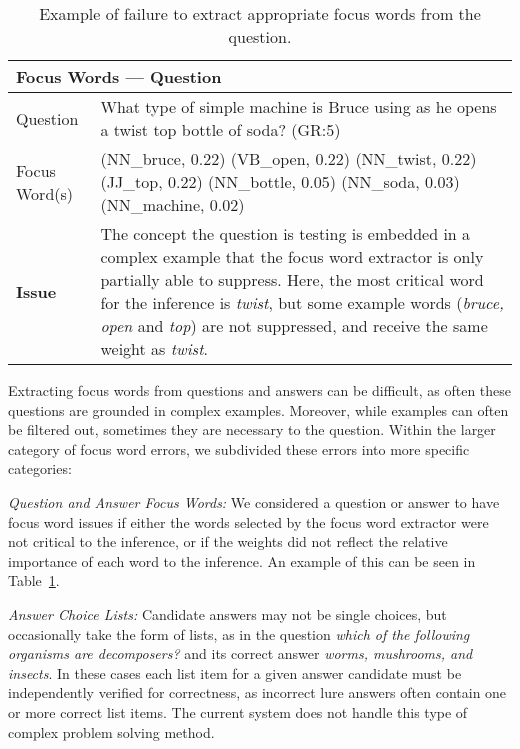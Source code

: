  
\begin{table}[]
\caption{{  Example of failure to extract appropriate focus words from the question. }} 
\begin{footnotesize}
\begin{tabularx}{\textwidth}{p{2.5cm}p{10cm}}
\hline
\multicolumn{2}{l}{Focus Words --- Question} \\
\hline
Question 		& What type of simple machine is Bruce using as he opens a twist top bottle of soda? (GR:5) \\
Focus Word(s) 	& (NN\_bruce, 0.22) (VB\_open, 0.22) (NN\_twist, 0.22) (JJ\_top, 0.22) (NN\_bottle, 0.05) (NN\_soda, 0.03) (NN\_machine, 0.02)		     \\
\textbf{Issue}	& The concept the question is testing is embedded in a complex example that the focus word extractor is only partially able to suppress. Here, the most critical word for the inference is \emph{twist}, but some example words (\emph{bruce, open} and \emph{top}) are not suppressed, and receive the same weight as \emph{twist}. \\
\hline
\end{tabularx}
\end{footnotesize}
\label{ex:majorfw}
\end{table}


{}
Extracting focus words from questions and answers can be difficult, as often these questions are grounded in complex examples.  Moreover, while examples can often be filtered out, sometimes they are necessary to the question. Within the larger category of focus word errors, we subdivided these errors into more specific categories: 

{\flushleft \emph{Question and Answer Focus Words: }}
We considered a question or answer to have focus word issues if either the words selected by the focus word extractor were not critical to the inference, or if the weights did not reflect the relative importance of each word to the inference.  An example of this can be seen in Table~\ref{ex:majorfw}.

{\flushleft \emph{Answer Choice Lists: }}
Candidate answers may not be single choices, but occasionally take the form of lists, as in the question \emph{which of the following organisms are decomposers?} and its correct answer \emph{worms, mushrooms, and insects}.  In these cases each list item for a given answer candidate must be independently verified for correctness, as incorrect lure answers often contain one or more correct list items.  The current system does not handle this type of complex problem solving method. 

